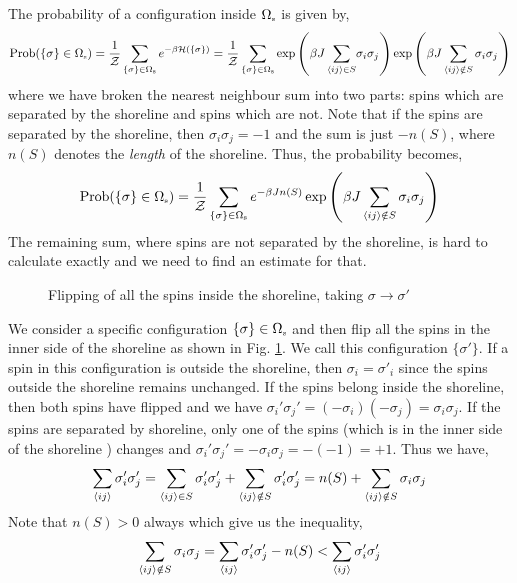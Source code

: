 \noindent
The probability of a configuration inside $\Omega_{\text{\tiny s}}$ is given by, 
\begin{align}
    \mathrm{Prob}(\{\sigma\} \in \Omega_{\text{\tiny s}}) = \frac{1}{\mathcal Z}\sum\limits_{\{\sigma\}\in \Omega_{\text{\tiny s}}} e^{-\beta \mathcal H(\{\sigma\})} =\frac{1}{\mathcal Z}\sum\limits_{\{\sigma\}\in \Omega_{\text{\tiny s}}} \exp\qty({\scriptsize \beta J \sum\limits_{\left\langle ij \right\rangle\in S}}\sigma_i \sigma_j) \exp\qty(\beta J \sum\limits_{\left\langle ij \right\rangle\notin S}\sigma_i \sigma_j)
\end{align}
where we have broken the nearest neighbour sum into two parts: spins which are separated by the shoreline and spins which are not. Note that if the spins are separated by the shoreline, then $\sigma_i \sigma_j=-1$ and the sum is just $-n(S)$, where $n(S)$ denotes the \textit{length} of the shoreline. Thus, the probability becomes,
\begin{align}\label{probdw}
    \mathrm{Prob}(\{\sigma\} \in \Omega_{\text{\tiny s}}) = \frac{1}{\mathcal Z}\sum\limits_{\{\sigma\}\in \Omega_{\text{\tiny s}}} e^{-\beta J n(S)} \exp\qty(\beta J \sum\limits_{\left\langle ij \right\rangle\notin S}\sigma_i \sigma_j) 
\end{align}
The remaining sum, where spins are not separated by the shoreline, is hard to calculate exactly and we need to find an estimate for that.
\begin{figure}[H]
    \centering 
    
    \caption{Flipping of all the spins inside the shoreline, taking $\sigma\to \sigma'$}
    \label{peirl4}
\end{figure}
\noindent
We consider a specific configuration $\{\sigma\}\in \Omega_{\text{\tiny s}}$ and then flip all the spins in the inner side of the shoreline as shown in Fig. \ref{peirl4}. We call this configuration $\{\sigma'\}$. If a spin in this configuration is outside the shoreline, then $\sigma_i = \sigma'_i$ since the spins outside the shoreline remains unchanged. If the spins belong inside the shoreline, then both spins have flipped and we have $\sigma_i'\sigma_j' = (-\sigma_i) (-\sigma_j) = \sigma_i\sigma_j$. If the spins are separated by shoreline, only one of the spins (which is in the inner side of the shoreline ) changes and $\sigma_i'\sigma_j' = -\sigma_i \sigma_j = -(-1)=+1$. Thus we have,
$$\sum\limits_{\left\langle ij \right\rangle}\sigma_i' \sigma_j ' = \sum\limits_{\left\langle ij \right\rangle\in S}\sigma_i' \sigma_j '+\sum\limits_{\left\langle ij \right\rangle\notin S}\sigma_i' \sigma_j ' = n(S)+\sum\limits_{\left\langle ij \right\rangle\notin S}\sigma_i \sigma_j$$
Note that $n(S)>0$ always which give us the inequality,
$$\sum\limits_{\left\langle ij \right\rangle\notin S} \sigma_i \sigma_j =\sum\limits_{\left\langle ij \right\rangle}\sigma_i' \sigma_j ' - n(S) <\sum\limits_{\left\langle ij \right\rangle}\sigma_i' \sigma_j '$$ 
